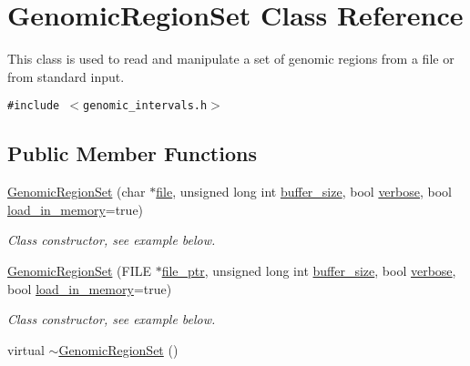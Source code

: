 \hypertarget{classGenomicRegionSet}{
\section{GenomicRegionSet Class Reference}
\label{classGenomicRegionSet}
}
This class is used to read and manipulate a set of genomic regions from a file or from standard input.  


{\tt \#include $<$genomic\_\-intervals.h$>$}

\subsection*{Public Member Functions}
\begin{CompactItemize}
\item 
\hypertarget{classGenomicRegionSet_afc417b2a9a27f3ad833828be5720e92}{
\hyperlink{classGenomicRegionSet_afc417b2a9a27f3ad833828be5720e92}{GenomicRegionSet} (char $\ast$\hyperlink{classGenomicRegionSet_7c593d1beab775590d5b810097644583}{file}, unsigned long int \hyperlink{classGenomicRegionSet_4d60b5403d2d6aaeda541ed45625b245}{buffer\_\-size}, bool \hyperlink{classGenomicRegionSet_2646e9e6d5da1693b4bea36a5acc082e}{verbose}, bool \hyperlink{classGenomicRegionSet_de43c6cd72b95da75395129b00a52687}{load\_\-in\_\-memory}=true)}
\label{classGenomicRegionSet_afc417b2a9a27f3ad833828be5720e92}

\begin{CompactList}\small\item\em Class constructor, see example below. \item\end{CompactList}\item 
\hypertarget{classGenomicRegionSet_8d18f09bd536bae9f2a2494d4cc19f65}{
\hyperlink{classGenomicRegionSet_8d18f09bd536bae9f2a2494d4cc19f65}{GenomicRegionSet} (FILE $\ast$\hyperlink{classGenomicRegionSet_4ca6c6268e39fdea2add6e6381c66962}{file\_\-ptr}, unsigned long int \hyperlink{classGenomicRegionSet_4d60b5403d2d6aaeda541ed45625b245}{buffer\_\-size}, bool \hyperlink{classGenomicRegionSet_2646e9e6d5da1693b4bea36a5acc082e}{verbose}, bool \hyperlink{classGenomicRegionSet_de43c6cd72b95da75395129b00a52687}{load\_\-in\_\-memory}=true)}
\label{classGenomicRegionSet_8d18f09bd536bae9f2a2494d4cc19f65}

\begin{CompactList}\small\item\em Class constructor, see example below. \item\end{CompactList}\item 
\hypertarget{classGenomicRegionSet_3fc7c6dc31cffcedf97a7b69a7f3c2c8}{
virtual \hyperlink{classGenomicRegionSet_3fc7c6dc31cffcedf97a7b69a7f3c2c8}{$\sim$GenomicRegionSet} ()}
\label{classGenomicRegionSet_3fc7c6dc31cffcedf97a7b69a7f3c2c8}


\end{CompactItemize}
